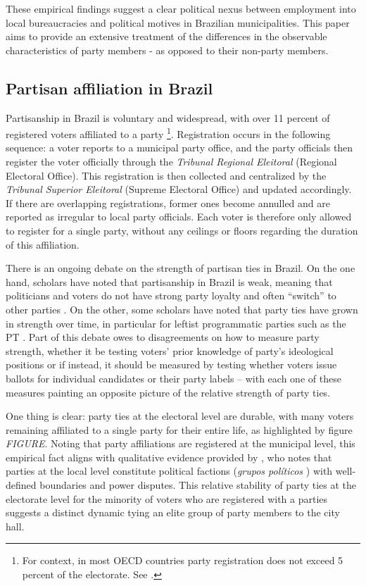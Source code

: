\documentclass[12pt,a4paper]{article}
\begin{document}
These empirical findings suggest a clear political nexus between employment into local bureaucracies and political motives in Brazilian municipalities. This paper aims to provide an extensive treatment of the differences in the observable characteristics of party members - as opposed to their non-party members.

\subsection{Partisan affiliation in Brazil}

Partisanship in Brazil is voluntary and widespread, with over 11 percent of registered voters affiliated to a party \citep{speck2015estudo}\footnote{For context, in most OECD countries party registration does not exceed 5 percent of the electorate. See \citet{biezen2014decline}.}. Registration occurs in the following sequence: a voter reports to a municipal party office, and the party officials then register the voter officially through the \emph{Tribunal Regional Eleitoral} (Regional Electoral Office). This registration is then collected and centralized by the \emph{Tribunal Superior Eleitoral} (Supreme Electoral Office) and updated accordingly. If there are overlapping registrations, former ones become annulled and are reported as irregular to local party officials. Each voter is therefore only allowed to register for a single party, without any ceilings or floors regarding the duration of this affiliation.

There is an ongoing debate on the strength of partisan ties in Brazil. On the one hand, scholars have noted that partisanship in Brazil is weak, meaning that politicians and voters do not have strong party loyalty and often ``switch'' to other parties \citep{desposato2006parties,ames2002deadlock}. On the other, some scholars have noted that party ties have grown in strength over time, in particular for leftist programmatic parties such as the PT \citep{samuels2014power,samuels2006sources}. Part of this debate owes to disagreements on how to measure party strength, whether it be testing voters' prior knowledge of party's ideological positions or if instead, it should be measured by testing whether voters issue ballots for individual candidates or their party labels -- with each one of these measures painting an opposite picture of the relative strength of party ties.

One thing is clear: party ties at the electoral level are durable, with many voters remaining affiliated to a single party for their entire life, as highlighted by figure \emph{FIGURE}. Noting that party affiliations are registered at the municipal level, this empirical fact aligns with qualitative evidence provided by \citet{palmeira1995comicios}, who notes that parties at the local level constitute political factions (\emph{grupos pol\'{i}ticos} ) with well-defined boundaries and power disputes. This relative stability of party ties at the electorate level for the minority of voters who are registered with a parties suggests a distinct dynamic tying an elite group of party members to the city hall.
\end{document}

